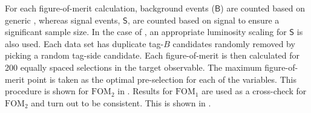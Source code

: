 For each figure-of-merit calculation, background events ($\mathsf{B}$) are counted based on generic \MC,
whereas signal events, $\mathsf{S}$, are counted based on signal \MC to ensure a significant sample size.
In the case of , an appropriate luminosity scaling for $\mathsf{S}$ is also used.
Each data set has duplicate tag-$B$ candidates randomly removed by picking a random tag-side candidate.
Each figure-of-merit is then calculated for 200 equally spaced selections in the target observable.
The maximum figure-of-merit point is taken as the optimal pre-selection for each of the variables.
This procedure is shown for $\mathrm{FOM}_2$ in .
Results for $\mathrm{FOM}_1$ are used as a cross-check for $\mathrm{FOM_2}$ and turn out to be consistent.
This is shown in .
